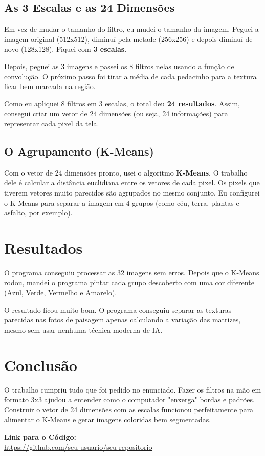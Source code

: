 \documentclass[twocolumn]{article}
\begin{document}
\subsection{As 3 Escalas e as 24 Dimensões}
Em vez de mudar o tamanho do filtro, eu mudei o tamanho da imagem. Peguei a imagem original (512x512), diminuí pela metade (256x256) e depois diminuí de novo (128x128). Fiquei com \textbf{3 escalas}.

Depois, peguei as 3 imagens e passei os 8 filtros nelas usando a função de convolução. O próximo passo foi tirar a média de cada pedacinho para a textura ficar bem marcada na região.

Como eu apliquei 8 filtros em 3 escalas, o total deu \textbf{24 resultados}. Assim, consegui criar um vetor de 24 dimensões (ou seja, 24 informações) para representar cada pixel da tela.

\subsection{O Agrupamento (K-Means)}
Com o vetor de 24 dimensões pronto, usei o algoritmo \textbf{K-Means}. O trabalho dele é calcular a distância euclidiana entre os vetores de cada pixel. Os pixels que tiverem vetores muito parecidos são agrupados no mesmo conjunto. 
Eu configurei o K-Means para separar a imagem em 4 grupos (como céu, terra, plantas e asfalto, por exemplo).

\section{Resultados}
O programa conseguiu processar as 32 imagens sem erros. Depois que o K-Means rodou, mandei o programa pintar cada grupo descoberto com uma cor diferente (Azul, Verde, Vermelho e Amarelo). 

O resultado ficou muito bom. O programa conseguiu separar as texturas parecidas nas fotos de paisagem apenas calculando a variação das matrizes, mesmo sem usar nenhuma técnica moderna de IA. 

\section{Conclusão}
O trabalho cumpriu tudo que foi pedido no enunciado. Fazer os filtros na mão em formato 3x3 ajudou a entender como o computador "enxerga" bordas e padrões. Construir o vetor de 24 dimensões com as escalas funcionou perfeitamente para alimentar o K-Means e gerar imagens coloridas bem segmentadas.

\vspace{12pt}
\noindent\textbf{Link para o Código:} \\
\url{https://github.com/seu-usuario/seu-repositorio}
\end{document}
